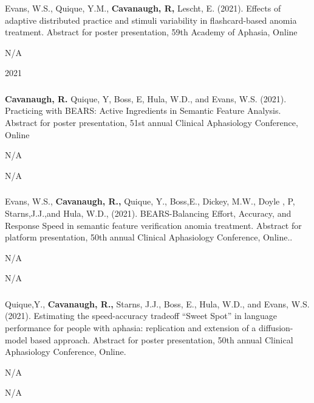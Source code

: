 \documentclass[
]{article}
\begin{document}
Evans, W.S., Quique, Y.M., \textbf{Cavanaugh, R,} Lescht, E. (2021).
Effects of adaptive distributed practice and stimuli variability in
flashcard-based anomia treatment. Abstract for poster presentation, 59th
Academy of Aphasia, Online

N/A

2021

\hypertarget{section-9}{%
\subsubsection{}\label{section-9}}

\textbf{Cavanaugh, R.} Quique, Y, Boss, E, Hula, W.D., and Evans, W.S.
(2021). Practicing with BEARS: Active Ingredients in Semantic Feature
Analysis. Abstract for poster presentation, 51st annual Clinical
Aphasiology Conference, Online

N/A

N/A

\hypertarget{section-10}{%
\subsubsection{}\label{section-10}}

Evans, W.S., \textbf{Cavanaugh, R.,} Quique, Y., Boss,E., Dickey, M.W.,
Doyle , P, Starns,J.J.,and Hula, W.D., (2021). BEARS-Balancing Effort,
Accuracy, and Response Speed in semantic feature verification anomia
treatment. Abstract for platform presentation, 50th annual Clinical
Aphasiology Conference, Online..

N/A

N/A

\hypertarget{section-11}{%
\subsubsection{}\label{section-11}}

Quique,Y., \textbf{Cavanaugh, R.,} Starns, J.J., Boss, E., Hula, W.D.,
and Evans, W.S. (2021). Estimating the speed-accuracy tradeoff ``Sweet
Spot'' in language performance for people with aphasia: replication and
extension of a diffusion-model based approach. Abstract for poster
presentation, 50th annual Clinical Aphasiology Conference, Online.

N/A

N/A

\hypertarget{section-12}{%
\subsubsection{}\label{section-12}}
\end{document}
